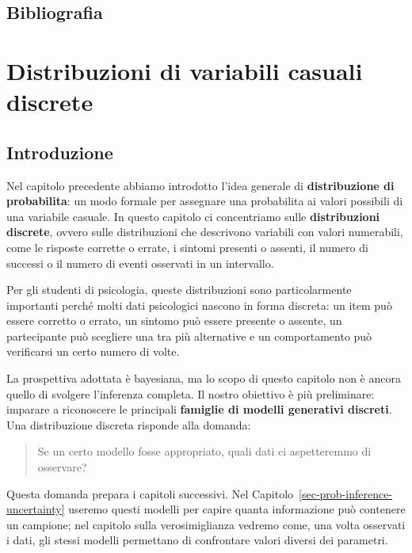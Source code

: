 \documentclass[
  italian,
  letterpaper,
  a4paper,
  11pt,
  open=any]{scrbook}
\theoremstyle{plain}
\theoremstyle{definition}
\theoremstyle{definition}
\theoremstyle{remark}
\begin{document}
\section*{Bibliografia}\label{bibliografia-4}


\chapter{Distribuzioni di variabili casuali
discrete}\label{sec-prob-discr-distr}

\section*{Introduzione}\label{introduzione-10}


Nel capitolo precedente abbiamo introdotto l'idea generale di
\textbf{distribuzione di probabilita}: un modo formale per assegnare una
probabilita ai valori possibili di una variabile casuale. In questo
capitolo ci concentriamo sulle \textbf{distribuzioni discrete}, ovvero
sulle distribuzioni che descrivono variabili con valori numerabili, come
le risposte corrette o errate, i sintomi presenti o assenti, il numero
di successi o il numero di eventi osservati in un intervallo.

Per gli studenti di psicologia, queste distribuzioni sono
particolarmente importanti perché molti dati psicologici nascono in
forma discreta: un item può essere corretto o errato, un sintomo può
essere presente o assente, un partecipante può scegliere una tra più
alternative e un comportamento può verificarsi un certo numero di volte.

La prospettiva adottata è bayesiana, ma lo scopo di questo capitolo non
è ancora quello di svolgere l'inferenza completa. Il nostro obiettivo è
più preliminare: imparare a riconoscere le principali \textbf{famiglie
di modelli generativi discreti}. Una distribuzione discreta risponde
alla domanda:

\begin{quote}
Se un certo modello fosse appropriato, quali dati ci aspetteremmo di
osservare?
\end{quote}

Questa domanda prepara i capitoli successivi. Nel
Capitolo~\ref{sec-prob-inference-uncertainty} useremo questi modelli per
capire quanta informazione può contenere un campione; nel capitolo sulla
verosimiglianza vedremo come, una volta osservati i dati, gli stessi
modelli permettano di confrontare valori diversi dei parametri.
\end{document}
